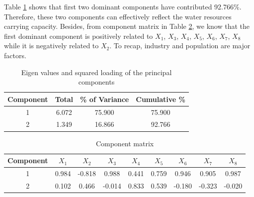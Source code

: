Table \ref{eigenvalues} shows that first two dominant components have contributed 92.766\%. Therefore, these two components can effectively reflect the water resources carrying capacity. Besides, from component matrix in Table \ref{copomentmatrix}, we know that the first dominant component is positively related to $X_1$, $X_3$, $X_4$, $X_5$, $X_6$, $X_7$, $X_8$ while it is negatively related to $X_2$. To recap, industry and population are major factors.
\begin{table}[h]
\centering\caption{Eigen values and squared loading of the principal components}
\begin{tabular}{c|c|c|c}
  \hline
  Component & Total & \% of Variance & Cumulative \% \\
  \hline
  1 & 6.072 & 75.900 & 75.900 \\
   \hline
  2 & 1.349 & 16.866 & 92.766 \\
  \hline
\end{tabular}\label{eigenvalues}
\end{table}
\begin{table}[h]
\centering\caption{Component matrix}
\begin{tabular}{c|cccccccc}
  \hline
  Component & $X_1$ & $X_2$ & $X_3$ & $X_4$ & $X_5$ & $X_6$ & $X_7$ & $X_8$ \\
  \hline
  1 & 0.984 & -0.818 & 0.988 & 0.441 & 0.759 & 0.946 & 0.905 & 0.987 \\
  2 & 0.102 & 0.466 & -0.014 & 0.833 & 0.539 & -0.180 & -0.323 & -0.020 \\
  \hline
\end{tabular}\label{copomentmatrix}
\end{table}

